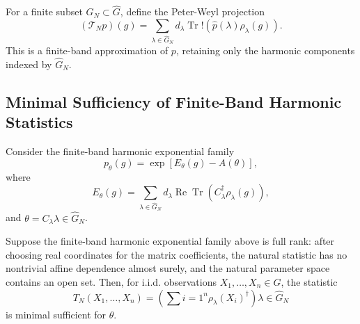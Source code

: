 \documentclass{ssl}
\begin{document}
For a finite subset $\widehat G_N\subset\widehat G$, define the Peter-Weyl projection
$$
(\mathcal T_Np)(g)
=
\sum_{\lambda\in\widehat G_N}
d_\lambda
\operatorname{Tr}!\left(
\widehat p(\lambda)\rho_\lambda(g)
\right).
$$
This is a finite-band approximation of $p$, retaining only the harmonic components indexed by $\widehat G_N$.

\subsection{Minimal Sufficiency of Finite-Band Harmonic Statistics}

Consider the finite-band harmonic exponential family
$$
p_\theta(g)
=
\exp\left[
E_\theta(g)-A(\theta)
\right],
$$
where
$$
E_\theta(g)
=
\sum_{\lambda\in\widehat G_N}
d_\lambda
\operatorname{Re}
\operatorname{Tr}
\left(
C_\lambda^\dagger\rho_\lambda(g)
\right),
$$
and $\theta={C_\lambda}{\lambda\in\widehat G_N}$.

\begin{theorem}
Suppose the finite-band harmonic exponential family above is full rank: after choosing real coordinates for the matrix coefficients, the natural statistic has no nontrivial affine dependence almost surely, and the natural parameter space contains an open set. Then, for i.i.d. observations $X_1,\dots,X_n\in G$, the statistic
$$
T_N(X_1,\dots,X_n)
=
\left(
\sum{i=1}^n \rho_\lambda(X_i)^\dagger
\right){\lambda\in\widehat G_N}
$$
is minimal sufficient for $\theta$.
\end{theorem}
\end{document}
